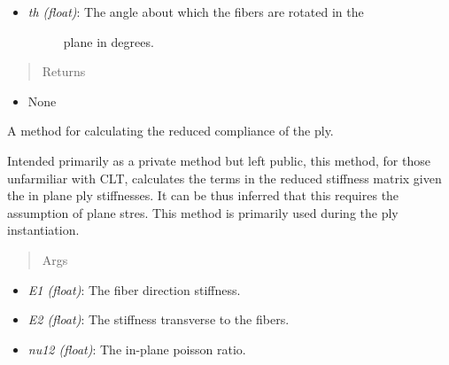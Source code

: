 \documentclass[letterpaper,10pt,english]{sphinxmanual}
\begin{document}
\begin{fulllineitems}
\begin{fulllineitems}
\begin{itemize}
\begin{description}
\end{description}

\item {} \begin{description}
\item[{\emph{th (float)}: The angle about which the fibers are rotated in the}] \leavevmode
plane in degrees.

\end{description}

\end{itemize}
\begin{quote}\begin{description}
\item[{Returns}] \leavevmode
\end{description}\end{quote}
\begin{itemize}
\item {} 
None

\end{itemize}

\end{fulllineitems}


\begin{fulllineitems}
\label{structures:AeroComBAT.Structures.Ply.genQ}
A method for calculating the reduced compliance of the ply.

Intended primarily as a private method but left public, this method,
for those unfarmiliar with CLT, calculates the terms in the reduced stiffness
matrix given the in plane ply stiffnesses. It can be thus inferred that
this requires the assumption of plane stres. This method is primarily
used during the ply instantiation.
\begin{quote}\begin{description}
\item[{Args}] \leavevmode
\end{description}\end{quote}
\begin{itemize}
\item {} 
\emph{E1 (float)}: The fiber direction stiffness.

\item {} 
\emph{E2 (float)}: The stiffness transverse to the fibers.

\item {} 
\emph{nu12 (float)}: The in-plane poisson ratio.


\end{itemize}
\end{fulllineitems}
\end{fulllineitems}
\end{document}
